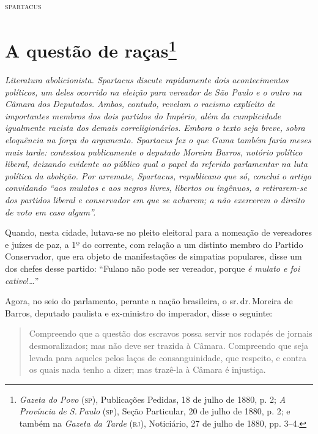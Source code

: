 \medskip{}
\hfill\textsc{spartacus}

\chapter{A questão de raças\footnote{\emph{Gazeta do Povo}
  (\textsc{sp}), Publicações Pedidas, 18 de julho de 1880, p. 2; \emph{A Província de S.\,Paulo} (\textsc{sp}), Seção Particular, 20 de julho de 1880, p. 2; e também na
  \emph{Gazeta da Tarde} (\textsc{rj}), Noticiário, 27 de julho de 1880, pp. 3--4.}}

\begin{resumo}
\emph{Literatura abolicionista. Spartacus discute rapidamente
dois acontecimentos políticos, um deles ocorrido na eleição para
vereador de São Paulo e o outro na Câmara dos Deputados. Ambos, contudo,
revelam o racismo explícito de importantes membros dos dois partidos do
Império, além da cumplicidade igualmente racista dos demais
correligionários. Embora o texto seja breve, sobra eloquência na força
do argumento. Spartacus fez o que Gama também faria meses mais
tarde: contestou publicamente o deputado Moreira Barros, notório
político liberal, deixando evidente ao público qual o papel do referido
parlamentar na luta política da abolição. Por arremate,
Spartacus, republicano que só, conclui o artigo convidando ``aos
mulatos e aos negros livres, libertos ou ingênuos, a retirarem-se dos
partidos liberal e conservador em que se acharem; a não exercerem o
direito de voto em caso algum''.}
\end{resumo}


Quando, nesta cidade, lutava-se no pleito eleitoral para a nomeação de
vereadores e juízes de paz, a 1º do corrente, com relação a um distinto
membro do Partido Conservador, que era objeto de manifestações de
simpatias populares, disse um dos chefes desse partido: ``Fulano não pode
ser vereador, porque \emph{é mulato e foi cativo}!\ldots{}''

Agora, no seio do parlamento, perante a nação brasileira, o sr.\,dr.\,Moreira de Barros, deputado paulista e ex-ministro do imperador, disse o seguinte:

\begin{quote}
Compreendo que a questão dos escravos possa servir nos rodapés de
jornais desmoralizados; mas não deve ser trazida à Câmara. Compreendo
que seja levada para aqueles pelos laços de consanguinidade, que
respeito, e contra os quais nada tenho a dizer; mas trazê-la à Câmara é
injustiça.
\end{quote}

